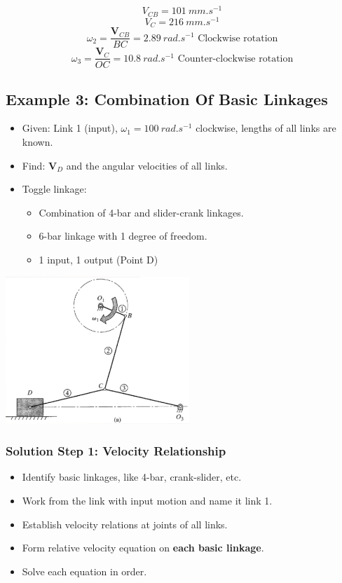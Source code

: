 \documentclass[11pt]{article}
\begin{document}
\[V_{CB} = \qty{101}{mm.s^{-1}}\]
\[V_{C} = \qty{216}{mm.s^{-1}}\]
\[\omega_2 = \frac{\boldsymbol{V}_{CB}}{BC} = \qty{2.89}{rad.s^{-1}} \text{ Clockwise rotation}\]
\[\omega_3 = \frac{\boldsymbol{V}_C}{OC} = \qty{10.8}{rad.s^{-1}} \text{ Counter-clockwise rotation}\]

 \newpage
\subsection{Example 3: Combination Of Basic Linkages}
\label{sec:org6f70cbf}
\begin{itemize}
\item Given: Link 1 (input), \(\omega_1 = \qty{100}{rad.s^{-1}}\) clockwise, lengths of all links are known.
\item Find: \(\boldsymbol{V}_D\) and the angular velocities of all links.
\item Toggle linkage:
\begin{itemize}
\item Combination of 4-bar and slider-crank linkages.
\item 6-bar linkage with 1 degree of freedom.
\item 1 input, 1 output (Point D)
\end{itemize}
\end{itemize}

\begin{center}
\includegraphics[height=15em]{./images/combination-of-basic-linkages-graphical-analysis.png}
\end{center}
\subsubsection{Solution Step 1: Velocity Relationship}
\label{sec:org74070c4}
\begin{itemize}
\item Identify basic linkages, like 4-bar, crank-slider, etc.
\item Work from the link with input motion and name it link 1.
\item Establish velocity relations at joints of all links.
\item Form relative velocity equation on \textbf{each basic linkage}.
\item Solve each equation in order.
\end{itemize}
\end{document}
